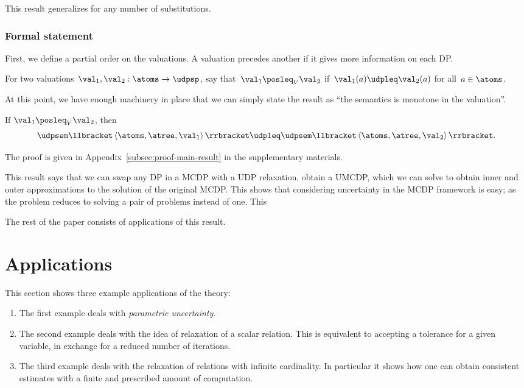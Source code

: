 This result generalizes for any number of substitutions.

\subsubsection*{Formal statement}

First, we define a partial order on the valuations. A valuation precedes
another if it gives more information on each DP.
\begin{definition}
\label{def:For-two-valuations,}For two valuations~$\val_{1},\val_{2}:\atoms\rightarrow\udpsp$,
say that~$\val_{1}\posleq_{V}\val_{2}$ if~$\val_{1}(a)\udpleq\val_{2}(a)$
for all~$a\in\atoms$.
\end{definition}
At this point, we have enough machinery in place that we can simply
state the result as ``the semantics is monotone in the valuation''.
\begin{theorem}
\label{thm:udpsem-monotone}If $\val_{1}\posleq_{V}\val_{2}$, then
\[
\udpsem\llbracket\left\langle \atoms,\atree,\val_{1}\right\rangle \rrbracket\udpleq\udpsem\llbracket\left\langle \atoms,\atree,\val_{2}\right\rangle \rrbracket.
\]
\end{theorem}
The proof is given in Appendix~\cref{subsec:proof-main-result}
in the supplementary materials.

This result says that we can swap any DP in a MCDP with a UDP relaxation,
obtain a UMCDP, which we can solve to obtain inner and outer approximations
to the solution of the original MCDP. This shows that considering
uncertainty in the MCDP framework is easy; as the problem reduces
to solving a pair of problems instead of one. This

The rest of the paper consists of applications of this result.

\section{Applications\label{sec:Applications}}

This section shows three example applications of the theory:
\begin{enumerate}
\item The first example deals with \emph{parametric uncertainty}.
\item The second example deals with the idea of relaxation of a scalar relation.
This is equivalent to accepting a tolerance for a given variable,
in exchange for a reduced number of iterations.
\item The third example deals with the relaxation of relations with infinite
cardinality. In particular it shows how one can obtain consistent
estimates with a finite and prescribed amount of computation.
\end{enumerate}

